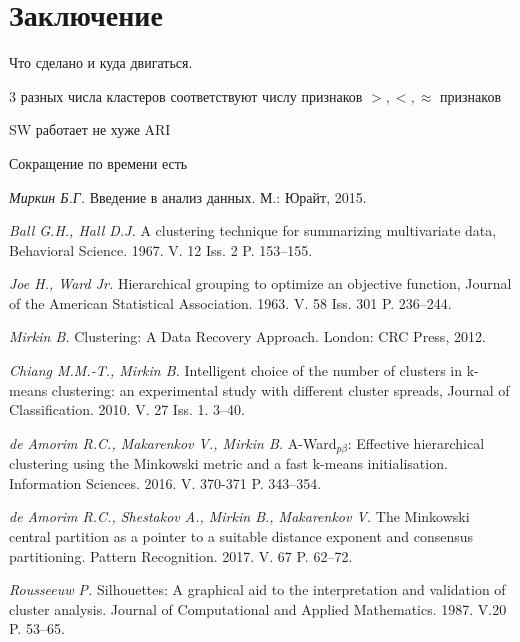 \documentclass[12pt]{a&t}
\begin{document}
\section{Заключение}

Что сделано и куда двигаться.
\begin{enumlist} %
	\item
	3 разных числа кластеров соответствуют числу признаков $ >,<,\approx $ признаков	
	\item
	SW работает не хуже ARI
	\item
	Сокращение по времени есть
\end{enumlist}

\begin{thebibliography}{10}


{\it Миркин Б.Г.}
Введение в анализ данных. М.: Юрайт, 2015.

{\it Ball G.H., Hall D.J.}
A clustering technique for summarizing multivariate data, Behavioral Science. 1967. V. 12 Iss. 2 P. 153--155.

{\it Joe H., Ward Jr.}
Hierarchical grouping to optimize an objective function, Journal of the American Statistical Association. 1963. V. 58 Iss. 301 P. 236--244.

{\it Mirkin B.}
Clustering: A Data Recovery Approach. London: CRC Press, 2012.

{\it Chiang M.M.-T., Mirkin B.}
Intelligent choice of the number of clusters in k-means clustering: an experimental study with different cluster spreads, Journal of Classification. 2010. V. 27 Iss. 1. 3--40.

{\it de Amorim R.C., Makarenkov V., Mirkin B.}
\mbox{A-Ward$ _{p\beta} $}: Effective hierarchical clustering using the Minkowski metric and a fast \mbox{k-means} initialisation. Information Sciences. 2016. V. 370-371 P. 343--354.

{\it de Amorim R.C., Shestakov A., Mirkin B., Makarenkov V.}
The Minkowski central partition as a pointer to a suitable distance exponent and consensus partitioning. Pattern Recognition. 2017. V. 67 P. 62--72.

{\it Rousseeuw P.}
Silhouettes: A graphical aid to the interpretation and validation of cluster analysis. Journal of Computational and Applied Mathematics. 1987. V.20 P. 53--65.

\end{thebibliography}


\end{document}
